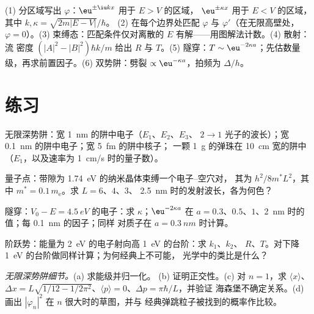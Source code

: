 \begin{method}[势阱与势垒]\label{meth:b2:potential-wells-tunneling:method}
(1) 分区域写出 $\varphi$：$\eu^{\pm\iu kx}$ 用于 $E > V$ 的区域，
$\eu^{\pm\kappa x}$ 用于 $E < V$ 的区域，其中 $k, \kappa = \sqrt{2m|E - V|}/\hbar$。
(2) 在每个边界处匹配 $\varphi$ 与 $\varphi'$（在无限高壁处，
$\varphi = 0$）。(3) 束缚态：匹配条件仅对离散的
$E$ 有解——用图解法计数。(4) 散射：流
密度 $(|A|^2 - |B|^2)\hbar k/m$ 给出 $R$ 与 $T$。(5) 隧穿：$T \sim
\eu^{-2\kappa a}$；先估数量级，再求前置因子。(6)
双势阱：劈裂 $\propto\eu^{-\kappa a}$，拍频为 $\Delta/h$。
\end{method}

\section{练习}

\begin{exercise}[$\star$]\label{exo:b2:potential-wells-tunneling:1}
无限深势阱：宽 \qty{1}{nm} 的阱中电子（$E_1$、$E_2$、$E_3$、
$2 \to 1$ 光子的波长）；宽 \qty{0.1}{nm} 的阱中电子；宽 \qty{5}{fm} 的阱中核子；
一颗 \qty{1}{g} 的弹珠在 \qty{10}{cm} 宽的阱中（$E_1$，以及速率为
\qty{1}{cm/s} 时的量子数）。
\end{exercise}

\begin{exercise}[$\star$]\label{exo:b2:potential-wells-tunneling:2}
量子点：带隙为 \qty{1.74}{eV} 的纳米晶体束缚一个电子–空穴对，
其为 $h^2/8m^*L^2$，其中
$m^* = 0.1\,m_{\text{e}}$。求 $L = 6$、$4$、$3$、
\qty{2.5}{nm} 时的发射波长，各为何色？
\end{exercise}

\begin{exercise}[$\star$]\label{exo:b2:potential-wells-tunneling:3}
隧穿：$V_0 - E = \qty{4.5}{eV}$ 的电子：求 $\kappa$；$\eu^{-2\kappa a}$
在 $a = 0.3$、$0.5$、$1$、\qty{2}{nm} 时的值；每 \qty{0.1}{nm} 的因子；同样
对质子在 $a = \qty{0.3}{nm}$ 时计算。
\end{exercise}

\begin{exercise}[$\star$]\label{exo:b2:potential-wells-tunneling:4}
阶跃势：能量为 \qty{2}{eV} 的电子射向高 \qty{1}{eV} 的台阶：求 $k_1$、$k_2$、
$R$、$T$。对下降 \qty{1}{eV} 的台阶做同样计算；为何经典上不可能，
光学中的类比是什么？
\end{exercise}

\begin{exercise}[$\star\star$]\label{exo:b2:potential-wells-tunneling:5}
\emph{无限深势阱细节。}(a) 求能级并归一化。
(b) 证明正交性。(c) 对 $n = 1$，求 $\langle x\rangle$、$\Delta x =
L\sqrt{1/12 - 1/2\pi^2}$、$\langle p\rangle = 0$、$\Delta p = \pi\hbar/L$，并验证
海森堡不确定关系。(d) 画出 $|\varphi_n|^2$ 在 $n$ 很大时的草图，并与
经典弹跳粒子被找到的概率作比较。
\end{exercise}

